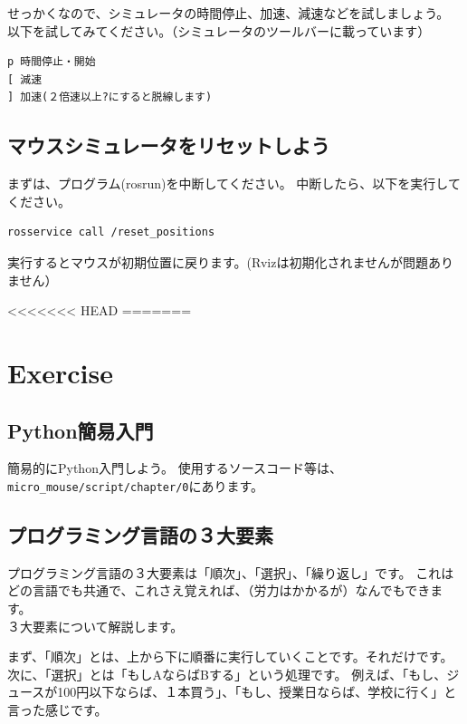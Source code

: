 \documentclass[11pt,a4paper]{jsarticle}
\begin{document}
せっかくなので、シミュレータの時間停止、加速、減速などを試しましょう。
以下を試してみてください。（シミュレータのツールバーに載っています）
\begin{lstlisting}[frame=single]
p 時間停止・開始
[ 減速
] 加速(２倍速以上?にすると脱線します)
\end{lstlisting}


\subsection{マウスシミュレータをリセットしよう}
まずは、プログラム(rosrun)を中断してください。
中断したら、以下を実行してください。
\begin{lstlisting}[frame=single]
rosservice call /reset_positions
\end{lstlisting}
実行するとマウスが初期位置に戻ります。(Rvizは初期化されませんが問題ありません）

<<<<<<< HEAD
=======
\section{Exercise}
\subsection{Python簡易入門}
簡易的にPython入門しよう。
使用するソースコード等は、\verb|micro_mouse/script/chapter/0|にあります。

\subsection{プログラミング言語の３大要素}
プログラミング言語の３大要素は「順次」、「選択」、「繰り返し」です。
これはどの言語でも共通で、これさえ覚えれば、（労力はかかるが）なんでもできます。\\


３大要素について解説します。

まず、「順次」とは、上から下に順番に実行していくことです。それだけです。\\


次に、「選択」とは「もしAならばBする」という処理です。
例えば、「もし、ジュースが100円以下ならば、１本買う」、「もし、授業日ならば、学校に行く」と言った感じです。\\
\end{document}
